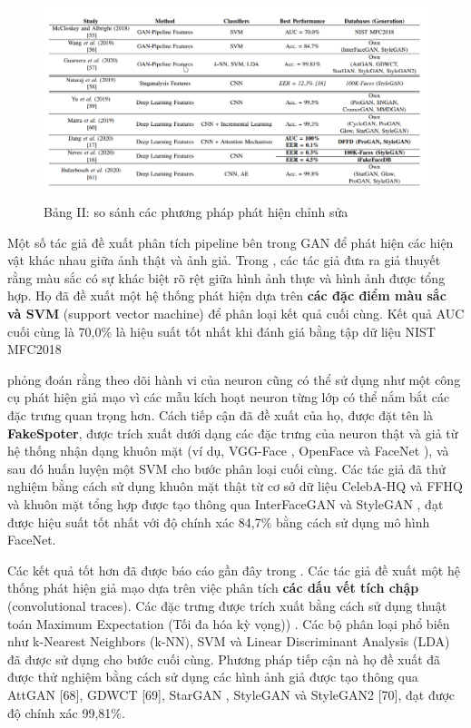 \documentclass{article}
\begin{document}
\begin{figure}[h!]
\caption{Bảng II: so sánh các phương pháp phát hiện chỉnh sửa}
\includegraphics[width=\columnwidth]{table-2-compare}
\label{table-2-compare}
\end{figure}

Một số tác giả đề xuất phân tích pipeline bên trong GAN để phát hiện các hiện vật khác nhau giữa ảnh thật và ảnh giả. Trong , các tác giả đưa ra giả thuyết rằng màu sắc có sự khác biệt rõ rệt giữa hình ảnh thực và hình ảnh được tổng hợp. Họ đã đề xuất một hệ thống phát hiện dựa trên \textbf{các đặc điểm màu sắc và SVM} (support vector machine) để phân loại kết quả cuối cùng. Kết quả AUC cuối cùng là 70,0\% là hiệu suất tốt nhất khi đánh giá bằng tập dữ liệu NIST MFC2018 

 phỏng đoán rằng theo dõi hành vi của neuron cũng có thể sử dụng như một công cụ phát hiện giả mạo vì các mẫu kích hoạt neuron từng lớp có thể nắm bắt các đặc trưng quan trọng hơn. Cách tiếp cận đã đề xuất của họ, được đặt tên là \textbf{FakeSpoter}, được trích xuất dưới dạng các đặc trưng của neuron thật và giả từ hệ thống nhận dạng khuôn mặt (ví dụ, VGG-Face , OpenFace  và FaceNet ), và sau đó huấn luyện một SVM cho bước phân loại cuối cùng. Các tác giả đã thử nghiệm bằng cách sử dụng khuôn mặt thật từ cơ sở dữ liệu CelebA-HQ  và FFHQ  và khuôn mặt tổng hợp được tạo thông qua InterFaceGAN  và StyleGAN , đạt được hiệu suất tốt nhất với độ chính xác 84,7\% bằng cách sử dụng mô hình FaceNet.

Các kết quả tốt hơn đã được báo cáo gần đây trong . Các tác giả đề xuất một hệ thống phát hiện giả mạo dựa trên việc phân tích \textbf{các dấu vết tích chập} (convolutional traces). Các đặc trưng được trích xuất bằng cách sử dụng thuật toán Maximum Expectation (Tối đa hóa kỳ vọng)) . Các bộ phân loại phổ biến như k-Nearest Neighbors (k-NN), SVM và Linear Discriminant Analysis (LDA) đã được sử dụng cho bước cuối cùng. Phương pháp tiếp cận nà họ đề xuất đã được thử nghiệm bằng cách sử dụng các hình ảnh giả được tạo thông qua AttGAN [68], GDWCT [69], StarGAN , StyleGAN và StyleGAN2 [70], đạt được độ chính xác 99,81\%.
\end{document}
